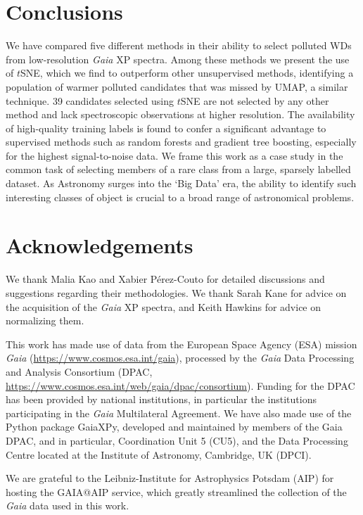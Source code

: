 \documentclass[fleqn,usenatbib]{rasti}
\begin{document}
\section{Conclusions} \label{sec:conclusion}

We have compared five different methods in their ability to select polluted WDs from low-resolution \textit{Gaia} XP spectra.
Among these methods we present the use of $t$SNE, which we find to outperform other unsupervised methods, identifying a population of warmer polluted candidates that was missed by UMAP, a similar technique.
39 candidates selected using $t$SNE are not selected by any other method and lack spectroscopic observations at higher resolution.
The availability of high-quality training labels is found to confer a significant advantage to supervised methods such as random forests and gradient tree boosting, especially for the highest signal-to-noise data.
We frame this work as a case study in the common task of selecting members of a rare class from a large, sparsely labelled dataset.
As Astronomy surges into the `Big Data' era, the ability to identify such interesting classes of object is crucial to a broad range of astronomical problems.




\section*{Acknowledgements}

We thank Malia Kao and Xabier P\'erez-Couto for detailed discussions and suggestions regarding their methodologies.
We thank Sarah Kane for advice on the acquisition of the \textit{Gaia} XP spectra, and Keith Hawkins for advice on normalizing them.

This work has made use of data from the European Space Agency (ESA) mission {\it Gaia} (\url{https://www.cosmos.esa.int/gaia}), processed by the {\it Gaia} Data Processing and Analysis Consortium (DPAC, \url{https://www.cosmos.esa.int/web/gaia/dpac/consortium}). Funding for the DPAC has been provided by national institutions, in particular the institutions participating in the {\it Gaia} Multilateral Agreement.
We have also made use of the Python package GaiaXPy, developed and maintained by members of the Gaia DPAC, and in particular, Coordination Unit 5 (CU5), and the Data Processing Centre located at the Institute of Astronomy, Cambridge, UK (DPCI).

We are grateful to the Leibniz-Institute for Astrophysics Potsdam (AIP) for hosting the GAIA@AIP service, which greatly streamlined the collection of the \textit{Gaia} data used in this work.
\end{document}
